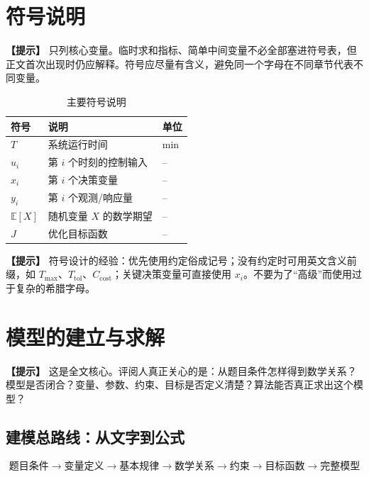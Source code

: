 \documentclass[12pt,a4paper]{article}
\newcommand{\tip}[1]{\par\noindent\textbf{【提示】} #1\par}
\begin{document}
\section{符号说明}

\tip{只列核心变量。临时求和指标、简单中间变量不必全部塞进符号表，但正文首次出现时仍应解释。符号应尽量有含义，避免同一个字母在不同章节代表不同变量。}

\begin{table}[H]
\centering
\caption{主要符号说明}
\label{tab:symbol}
\begin{tabular}{p{3cm}p{8cm}p{2cm}}
\toprule
符号 & 说明 & 单位\\
\midrule
$T$ & 系统运行时间 & min\\
$u_i$ & 第 $i$ 个时刻的控制输入 & --\\
$x_i$ & 第 $i$ 个决策变量 & --\\
$y_i$ & 第 $i$ 个观测/响应量 & --\\
$\mathbb{E}[X]$ & 随机变量 $X$ 的数学期望 & --\\
$J$ & 优化目标函数 & --\\
\bottomrule
\end{tabular}
\end{table}

\tip{符号设计的经验：优先使用约定俗成记号；没有约定时可用英文含义前缀，如 $T_{\max}$、$T_{\mathrm{tol}}$、$C_{\mathrm{cost}}$；关键决策变量可直接使用 $x_i$。不要为了“高级”而使用过于复杂的希腊字母。}

\section{模型的建立与求解}

\tip{这是全文核心。评阅人真正关心的是：从题目条件怎样得到数学关系？模型是否闭合？变量、参数、约束、目标是否定义清楚？算法能否真正求出这个模型？}

\subsection{建模总路线：从文字到公式}

\[
\boxed{
\text{题目条件}
\rightarrow
\text{变量定义}
\rightarrow
\text{基本规律}
\rightarrow
\text{数学关系}
\rightarrow
\text{约束}
\rightarrow
\text{目标函数}
\rightarrow
\text{完整模型}
}
\]
\end{document}
